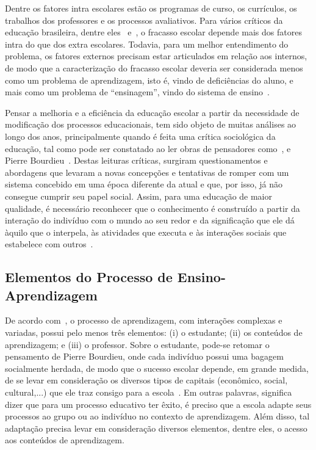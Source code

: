 Dentre os fatores intra escolares estão os programas de curso, os currículos, os trabalhos dos professores e os processos avaliativos. Para vários críticos da educação brasileira, dentre eles~\cite{Collares:1989} e~\cite{Perrenoud:2001}, o fracasso escolar depende mais dos fatores intra do que dos extra escolares. Todavia, para um melhor entendimento do problema, os fatores externos precisam estar articulados em relação aos internos, de modo que a caracterização do fracasso escolar deveria ser considerada menos como um problema de aprendizagem, isto é, vindo de deficiências do aluno, e mais como um problema de ``ensinagem'', vindo do sistema de ensino~\citep{Collares:1989}.

Pensar a melhoria e a eficiência da educação escolar a partir da necessidade de modificação dos processos educacionais, tem sido objeto de muitas análises ao longo dos anos, principalmente quando é feita uma crítica sociológica da educação, tal como pode ser constatado ao ler obras de pensadores como~\cite{charlot:2000}, \cite{Freire:1987} e Pierre Bourdieu~\citep{Nogueira:2013}. Destas leituras críticas, surgiram questionamentos e abordagens que levaram a novas concepções e tentativas de romper com um sistema concebido em uma época diferente da atual e que, por isso, já não consegue cumprir seu papel social. Assim, para uma educação de maior qualidade, é necessário reconhecer que o conhecimento é construído a partir da interação do indivíduo com o mundo ao seu redor e da significação que ele dá àquilo que o interpela, às atividades que executa e às interações sociais que estabelece com outros~\citep{charlot:2000}.

\subsection{Elementos do Processo de Ensino-Aprendizagem}\label{subsection:elementosprocessoaprendizagem}

De acordo com~\cite{bassedas:1996}, o processo de aprendizagem, com interações complexas e variadas, possui pelo menos três elementos: (i) o estudante; (ii) os conteúdos de aprendizagem; e (iii) o professor. Sobre o estudante, pode-se retomar o pensamento de Pierre Bourdieu, onde cada indivíduo possui uma bagagem socialmente herdada, de modo que o sucesso escolar depende, em grande medida, de se levar em consideração os diversos tipos de capitais (econômico, social, cultural,...) que ele traz consigo para a escola~\citep{Nogueira:2013}. Em outras palavras, significa dizer que para um processo educativo ter êxito, é preciso que a escola adapte seus processos ao grupo ou ao indivíduo no contexto de aprendizagem. Além disso, tal adaptação precisa levar em consideração diversos elementos, dentre eles, o acesso aos conteúdos de aprendizagem.

